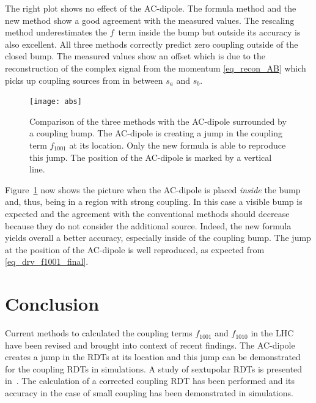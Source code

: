 The right plot shows no effect of the AC-dipole.
The formula method and the new method show a good
agreement with the measured values. The rescaling method underestimates the $f$~term inside the bump but outside
its accuracy is also excellent. All three methods correctly predict zero coupling outside of the closed bump.
The measured values show an offset which is due to the reconstruction of the complex signal from the
momentum \eqref{eq_recon_AB} which picks up coupling sources from in between $s_a$ and $s_b$.
%
\begin{figure}[h]
  \centering
  \texttt{[image: abs]}
  \caption{Comparison of the three methods with the AC-dipole surrounded by a coupling bump.
    The AC-dipole is creating a jump in the coupling term $f_{1001}$ at its location. Only the new
    formula is able to reproduce this jump. The position of the AC-dipole is marked by a vertical
    line.
  }
  \label{fig_comp_felix_ryo}
\end{figure}
%

Figure~\ref{fig_comp_felix_ryo} now shows the picture when the AC-dipole is placed \emph{inside} the bump and,
thus, being in a region with strong coupling. In this case a visible bump is expected and the agreement with the
conventional methods should decrease because they do not consider the additional source.
Indeed, the new formula yields overall a better accuracy, especially inside of the coupling bump.
The jump at the position of the AC-dipole is well reproduced, as expected from \eqref{eq_drv_f1001_final}.

\section{Conclusion}

Current methods to calculated the coupling terms $f_{1001}$ and $f_{1010}$ in the LHC have been revised and
brought into context of recent findings. The AC-dipole creates a jump in the RDTs at its location and this jump
can be demonstrated for the coupling RDTs in simulations. A study of sextupolar RDTs is presented in~\cite{Carlier2020}.
The calculation of a corrected coupling RDT has been performed and its accuracy in the case of small coupling
has been demonstrated in simulations.